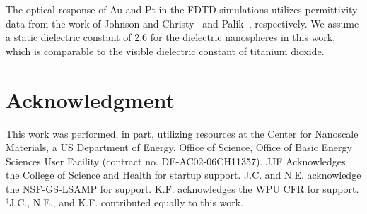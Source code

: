 \documentclass[journal=jpclcd,manuscript=article]{achemso}
\begin{document}
The optical response of Au and Pt in the FDTD simulations utilizes permittivity data from the work of Johnson and Christy~\cite{JC_PRB_1972} and Palik~\cite{Palik}, respectively.  We assume a static dielectric constant of 2.6 for
the dielectric nanospheres in this work, which is comparable to the visible dielectric constant of titanium dioxide. 

\section{Acknowledgment}
This work was performed, in part, utilizing resources at
the Center for Nanoscale Materials, a US Department of Energy, Office of Science, Office of
Basic Energy Sciences User Facility (contract no. DE-AC02-06CH11357).
JJF Acknowledges the College of Science and Health for startup support.
J.C. and N.E. acknowledge the NSF-GS-LSAMP for support.  K.F. acknowledges the WPU CFR for support.
$^{\dagger}$J.C., N.E., and K.F. contributed equally to this work.
 
\end{document}
